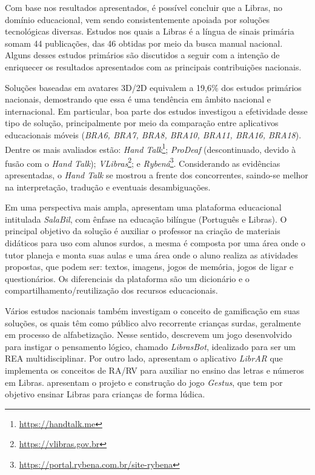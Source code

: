 Com base nos resultados apresentados, é possível concluir que a Libras, no domínio educacional, vem sendo consistentemente apoiada por soluções tecnológicas diversas. Estudos nos quais a Libras é a língua de sinais primária somam 44 publicações, das 46 obtidas por meio da busca manual nacional. Alguns desses estudos primários são discutidos a seguir com a intenção de enriquecer os resultados apresentados com as principais contribuições nacionais.

Soluções baseadas em avatares 3D/2D equivalem a 19,6\% dos estudos primários nacionais, demostrando que essa é uma tendência em âmbito nacional e internacional. Em particular, boa parte dos estudos investigou a efetividade desse tipo de solução, principalmente por meio da comparação entre aplicativos educacionais móveis (\textit{BRA6, BRA7, BRA8, BRA10, BRA11, BRA16, BRA18}). Dentre os mais avaliados estão: \textit{Hand Talk}\footnote{\url{https://handtalk.me}}; \textit{ProDeaf} (descontinuado, devido à fusão com o \textit{Hand Talk}); \textit{VLibras}\footnote{\url{https://vlibras.gov.br}}; e \textit{Rybená}\footnote{\url{https://portal.rybena.com.br/site-rybena}}. Considerando as evidências apresentadas, o \textit{Hand Talk} se mostrou a frente dos concorrentes, saindo-se melhor na interpretação, tradução e eventuais desambiguações.

Em uma perspectiva mais ampla,  apresentam uma plataforma educacional intitulada \textit{SalaBil}, com ênfase na educação bilíngue (Português e Libras). O principal objetivo da solução é auxiliar o professor na criação de materiais didáticos para uso com alunos surdos, a mesma é composta por uma área onde o tutor planeja e monta suas aulas e uma área onde o aluno realiza as atividades propostas, que podem ser: textos, imagens, jogos de memória, jogos de ligar e questionários. Os diferenciais da plataforma são um dicionário e o compartilhamento/reutilização dos recursos educacionais.

Vários estudos nacionais também investigam o conceito de gamificação em suas soluções, os quais têm como público alvo recorrente crianças surdas, geralmente em processo de alfabetização. Nesse sentido, \cite{BRA23} descrevem um jogo desenvolvido para instigar o pensamento lógico, chamado \textit{LibrasBot}, idealizado para ser um REA multidisciplinar. Por outro lado,  apresentam o aplicativo \textit{LibrAR} que implementa os conceitos de RA/RV para auxiliar no ensino das letras e números em Libras.  apresentam o projeto e construção do jogo \textit{Gestus}, que tem por objetivo ensinar Libras para crianças de forma lúdica. %

